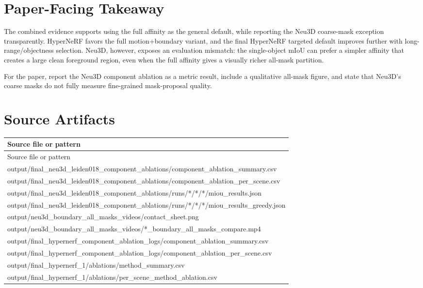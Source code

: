 \documentclass[10pt]{article}
\begin{document}
\section{Paper-Facing Takeaway}
The combined evidence supports using the full affinity as the general default, while reporting the Neu3D coarse-mask exception transparently.  HyperNeRF favors the full motion+boundary variant, and the final HyperNeRF targeted default improves further with long-range/objectness selection.  Neu3D, however, exposes an evaluation mismatch: the single-object mIoU can prefer a simpler affinity that creates a large clean foreground region, even when the full affinity gives a visually richer all-mask partition.

For the paper, report the Neu3D component ablation as a metric result, include a qualitative all-mask figure, and state that Neu3D's coarse masks do not fully measure fine-grained mask-proposal quality.

\section{Source Artifacts}
\small
\begin{longtable}{p{15cm}}
\toprule
Source file or pattern \\
\midrule
\endfirsthead
\toprule
Source file or pattern \\
\midrule
\endhead
output/final\_neu3d\_leiden018\_component\_ablations/component\_ablation\_summary.csv \\
output/final\_neu3d\_leiden018\_component\_ablations/component\_ablation\_per\_scene.csv \\
output/final\_neu3d\_leiden018\_component\_ablations/runs/*/*/*/miou\_results.json \\
output/final\_neu3d\_leiden018\_component\_ablations/runs/*/*/*/miou\_results\_greedy.json \\
output/neu3d\_boundary\_all\_masks\_videos/contact\_sheet.png \\
output/neu3d\_boundary\_all\_masks\_videos/*\_boundary\_all\_masks\_compare.mp4 \\
output/final\_hypernerf\_component\_ablation\_logs/component\_ablation\_summary.csv \\
output/final\_hypernerf\_component\_ablation\_logs/component\_ablation\_per\_scene.csv \\
output/final\_hypernerf\_1/ablations/method\_summary.csv \\
output/final\_hypernerf\_1/ablations/per\_scene\_method\_ablation.csv \\
\bottomrule
\end{longtable}
\normalsize
\end{document}
